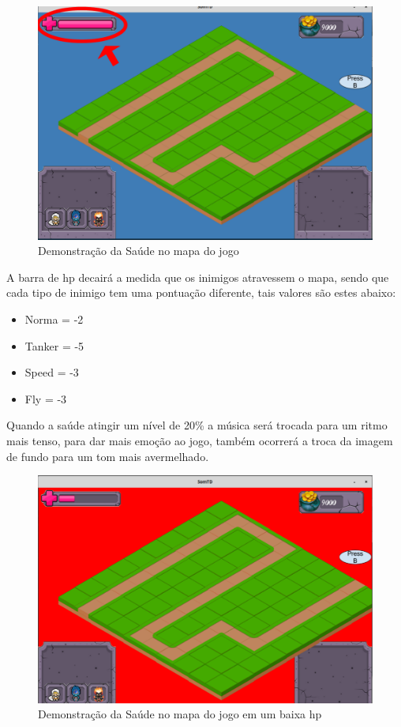 \documentclass[11pt]{article} %
\begin{document}
\begin{figure}[!htp]
\centering
\includegraphics[scale=0.3]{res/saude.png}
\caption{Demonstração da Saúde no mapa do jogo}
\label{Saúde}
\end{figure}
 
A barra de hp decairá a medida que os inimigos atravessem o mapa, sendo que cada tipo de inimigo tem uma pontuação diferente, tais valores são estes abaixo:

\begin{itemize}
 \item Norma = -2 
 \item Tanker = -5
 \item Speed = -3
 \item Fly = -3
 \end{itemize} 

Quando a saúde atingir um nível de 20\% a música será trocada para um ritmo mais tenso, para dar mais emoção ao jogo, também ocorrerá a troca da imagem de fundo para um tom mais avermelhado.

\begin{figure}[!htp]
\centering
\includegraphics[scale=0.3]{res/danger.png}
\caption{Demonstração da Saúde no mapa do jogo em um baixa hp}
\label{Saúde}
\end{figure}
\end{document}
